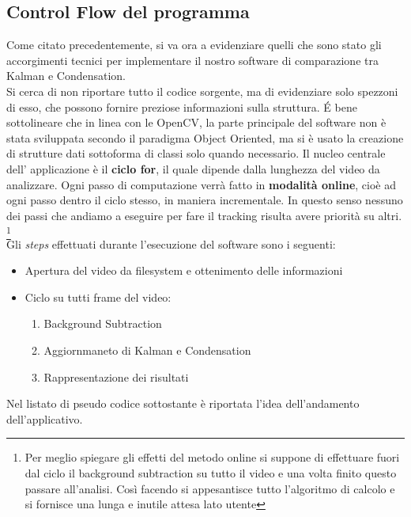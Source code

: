 \subsection{Control Flow del programma}\label{ControlFlow}
Come citato precedentemente, si va ora a evidenziare quelli che sono stato gli accorgimenti tecnici per implementare il nostro software di comparazione tra Kalman e Condensation.\\
Si cerca di non riportare tutto il codice sorgente, ma di evidenziare solo spezzoni di esso, che possono fornire preziose informazioni sulla struttura. \'E bene sottolineare che in linea con le OpenCV, la parte principale del software non è stata sviluppata secondo il paradigma Object Oriented, ma si è usato la creazione di strutture dati sottoforma di classi solo quando necessario.
Il nucleo centrale dell' applicazione è il \textbf{ciclo for}, il quale dipende dalla lunghezza del video da analizzare. Ogni passo di computazione verrà fatto in \textbf{modalità online}, cioè ad ogni passo dentro il ciclo stesso, in maniera incrementale. In questo senso nessuno dei passi che andiamo a eseguire per fare il tracking risulta avere priorità su altri. \footnote{Per meglio spiegare gli effetti del metodo online si suppone di effettuare fuori dal ciclo il background subtraction su tutto il video e una volta finito questo passare all'analisi. Così facendo si appesantisce tutto l'algoritmo di calcolo e si fornisce una lunga e inutile attesa lato utente} \\


Gli \textit{steps} effettuati durante l'esecuzione del software sono i seguenti:
\begin{itemize}
\item Apertura del video da filesystem e ottenimento delle informazioni
\item Ciclo su tutti frame del video:
	\begin{enumerate}
	\item Background Subtraction
	\item Aggiornmaneto di Kalman e Condensation
	\item Rappresentazione dei risultati 
	\end{enumerate}
\end{itemize}

Nel listato di pseudo codice sottostante è riportata l'idea dell'andamento dell'applicativo.


